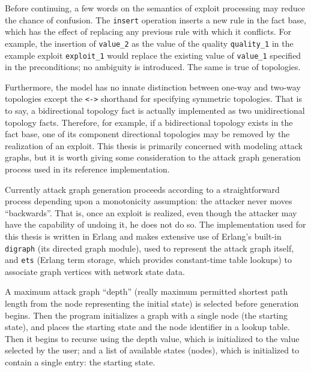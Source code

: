 Before continuing, a few words on the semantics of exploit processing may reduce
the chance of confusion. The \texttt{insert} operation inserts a new rule in the
fact base, which has the effect of replacing any previous rule with which it
conflicts. For example, the insertion of \texttt{value_2} as the value of the quality
\texttt{quality_1} in the example exploit \texttt{exploit_1} would replace the
existing value of \texttt{value_1} specified in the preconditions; no ambiguity
is introduced. The same is true of topologies.

Furthermore, the model has no innate distinction between one-way and two-way
topologies except the \texttt{<->} shorthand for specifying symmetric topologies.
That is to say, a bidirectional topology fact is actually implemented as
two unidirectional topology facts. Therefore, for example, if a bidirectional
topology exists in the fact base, one of its component directional topologies may
be removed by the realization of an exploit.
This thesis is primarily concerned with modeling attack graphs, but it is worth
giving some consideration to the attack graph generation process used in its
reference implementation.

Currently attack graph generation proceeds according to a straightforward process
depending upon a monotonicity assumption: the attacker never moves ``backwards''.
That is, once an exploit is realized, even though the attacker may have the capability
of undoing it, he does not do so. The implementation used for this thesis is written
in Erlang and makes extensive use of Erlang's built-in \texttt{digraph} (its directed 
graph module),
used to represent the attack graph itself, and \texttt{ets} (Erlang term storage, which
provides constant-time table lookups) to associate graph vertices with network state data.

A maximum attack graph ``depth'' (really maximum permitted shortest path length from the
node representing the initial state)
is selected before generation begins. Then the program initializes a graph with a single
node (the starting state), and places the starting state and the node identifier in a
lookup table. Then it begins to recurse using the depth value, which is initialized to
the value selected by the user; and a list of available 
states (nodes), which is initialized to contain a single entry: the starting state.

